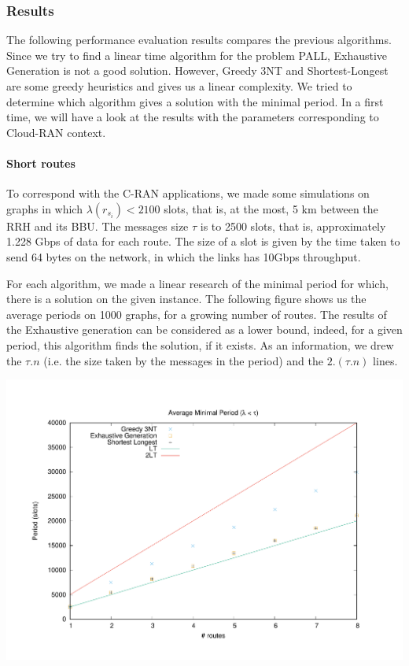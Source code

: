 \documentclass[a4paper,10pt]{article}
\begin{document}
      


    \subsubsection{Results}
      The following performance evaluation results compares the previous algorithms. Since we try to find a linear time algorithm for the problem PALL, Exhaustive Generation is not a good solution. However, Greedy 3NT and Shortest-Longest are some greedy heuristics and gives us a linear complexity. We tried to determine which algorithm gives a solution with the minimal period.
      In a first time, we will have a look at the results with the parameters corresponding to Cloud-RAN context.
      \paragraph{Short routes}
      To correspond with the C-RAN applications, we made some simulations on graphs in which $\lambda(r_{s_i}) < 2100$ slots, that is, at the most, 5 km between the RRH and its BBU. The messages size $\tau$ is to 2500 slots, that is, approximately 1.228 Gbps of data for each route. The size of a slot is given by the time taken to send 64 bytes on the network, in which the links has 10Gbps throughput.
      
      For each algorithm, we made a linear research of the minimal period for which, there is a solution on the given instance. The following figure shows us the average periods on 1000 graphs, for a growing number of routes.
      The results of the Exhaustive generation can be considered as a lower bound, indeed, for a given period, this algorithm finds the solution, if it exists.
      As an information, we drew the $\tau.n$ (i.e. the size taken by the messages in the period) and the $2.(\tau.n) $ lines.
      
      \begin{center}
      \includegraphics[scale=0.4]{periode_petite.pdf}
      \end{center}
     
\end{document}
